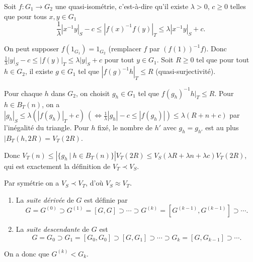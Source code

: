     \begin{preuve}
      Soit $f: G_1 \to G_2$ une quasi-isométrie, c'est-à-dire qu'il existe $\lambda > 0$, $c \geq 0$ telles
      que pour tous $x, y \in G_1$
        \[\frac{1}{\lambda} |x^{-1}y|_S - c \leq |f(x)^{-1}f(y)|_T \leq \lambda |x^{-1}y|_S + c.\]

        \begin{center}
        \end{center}
      On peut supposer $f(1_{G_1}) = 1_{G_2}$ (remplacer $f$ par $(f(1))^{-1}f)$. Donc $\frac{1}{\lambda}|y|_S
      - c \leq |f(y)|_T \leq \lambda |y|_S + c$ pour tout $y \in G_1$. Soit $R \geq 0$ tel que pour tout $h \in
      G_2$, il existe $g \in G_1$ tel que $|f(g)^{-1}h|_T \leq R$ (quasi-surjectivité).
      
      Pour chaque $h$ dans $G_2$, on choisit $g_h \in G_1$ tel que $f(g_h)^{-1}h|_T \leq R$. Pour $h \in
      B_T(n)$, on a $|g_h|_S \leq \lambda (|f(g_h)|_T + c)\ ( \iff \frac{1}{\lambda}|g_h|-c \leq |f(g_h)|) \leq
      \lambda (R+n+c)$ par l'inégalité du triangle. Pour $h$ fixé, le nombre de $h'$ avec $g_h = g_{h'}$ est
      au plus $|B_T(h, 2R) = V_T(2R)$.

      Donc $V_T(n) \leq \left| \{g_h\ |\ h \in B_T(n)\} \right| V_T(2R) \leq V_S(\lambda R + \lambda n +
      \lambda c)V_T(2R)$, qui est exactement la définition de $V_T \prec V_S$.
      
      Par symétrie on a $V_S \prec V_T$, d'où $V_S \approx V_T$.
    \end{preuve}


    \begin{defi}
      \begin{enumerate}
      \item La \emph{suite dérivée}  de $G$ est définie par 
        \[G = G^{(0)} \supset G^{(1)} = [G,G] \supset \cdots \supset G^{(k)} = [G^{(k-1)}, G^{(k-1)}] \supset \cdots.\]
      \item La \emph{suite descendante}  de $G$ est 
          \[G = G_0 \supset G_1 = [G_0, G_0] \supset [G, G_1] \supset \cdots \supset G_k = [G, G_{k-1}]
          \supset \cdots.\]
      \end{enumerate}
      On a donc que $G^{(k)} < G_k$.
    \end{defi}

